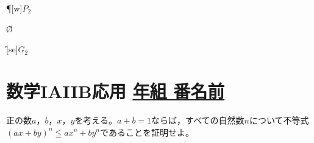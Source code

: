 \documentclass[b5j]{jarticle}
\def\Name#1{\section{\large\bf  #1\hfill
\underline{ \hspace{1zw}年\hspace{2zw}組\hspace{2zw}
番名前\hspace{12zw}}}}
\begin{document}
\begin{caprm}
\begin{multicols*}{2}
\begin{center}
\begin{zahyou}[haiti=t,ul=12mm,yokozikukigou={$x$},tatezikukigou={$y$},gentenhaiti={[sw]},yokozikuhaiti={[s]},tatezikuhaiti={[w]},yscale=1]
\Put\P[w]{$P_2$}

\Put{}

\CandL\A\ra\O\M\GG\G

\mTyokusen{}

\Put\G[se]{$G_2$}

\kuromaru{\Q;\R;\M;\P;\G;\PPPP}









\end{zahyou}
\end{center}


\end{multicols*}



\end{caprm}
\newpage

\Name{数学IAIIB応用}
\hakosyokika
正の数$a$，$b$，$x$，$y$を考える。$a+b=1$ならば，すべての自然数$n$について不等式$(ax+by)^{n}\leqq ax^{n}+by^{n}$であることを証明せよ。
\end{document}

